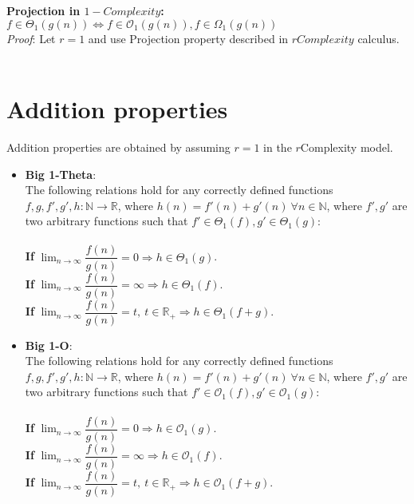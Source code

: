  \hfill\break
 
  \textbf{Projection in $1-Complexity$:}  \\  $ f \in \Theta_{1}(g(n)) \Leftrightarrow f \in \mathcal{O}_{1}(g(n)), f \in \Omega_{1}(g(n)) $
      \\\textit{Proof}:
   Let $r = 1$ and use Projection property described in $rComplexity$ calculus.
 \qedsymbol
 \\ \\
 \hfill\break

 
 
 
\section{Addition properties}
Addition properties are obtained by assuming $r = 1$ in the $r$Complexity model.
\begin{itemize}
  \item \textbf{Big 1-Theta}:  \\
The following relations hold for any correctly defined functions $f, g, f', g', h:\mathbb{N}\longrightarrow\mathbb{R}$, where $ h(n) = f'(n) + g'(n)\  \forall n \in  \mathbb{N} $, where $f',g'$ are two arbitrary functions such that $ f' \in \Theta_{1}(f),  g' \in \Theta_{1}(g) $:  
  \\ \\
  \textbf{If} $ \lim_{n\to\infty} \dfrac{f(n)}{g(n)} = 0 \Rightarrow  h \in \Theta_{1}(g) $. \\

  \textbf{If} $ \lim_{n\to\infty} \dfrac{f(n)}{g(n)} = \infty \Rightarrow  h \in \Theta_{1}(f) $. \\

  \textbf{If} $ \lim_{n\to\infty} \dfrac{f(n)}{g(n)} = t, \ t \in \mathbb{R}_{+} \Rightarrow  h \in \Theta_{1} \left( f + g \right) $. \\

  \item \textbf{Big 1-O}: \\
The following relations hold for any correctly defined functions $f, g, f', g', h:\mathbb{N}\longrightarrow\mathbb{R}$, where $ h(n) = f'(n) + g'(n)\  \forall n \in \mathbb{N} $, where $f',g'$ are two arbitrary functions such that $ f' \in \mathcal{O}_{1}(f),  g' \in \mathcal{O}_{1}(g) $:  
  \\ \\

  \textbf{If} $ \lim_{n\to\infty} \dfrac{f(n)}{g(n)} = 0 \Rightarrow  h \in \mathcal{O}_{1}(g) $. \\
  \textbf{If} $ \lim_{n\to\infty} \dfrac{f(n)}{g(n)} = \infty \Rightarrow  h \in \mathcal{O}_{1}(f) $. \\
  \textbf{If} $ \lim_{n\to\infty} \dfrac{f(n)}{g(n)} = t, \ t \in \mathbb{R}_{+} \Rightarrow  h \in \mathcal{O}_{1} \left( f + g \right) $. \\



\end{itemize}
